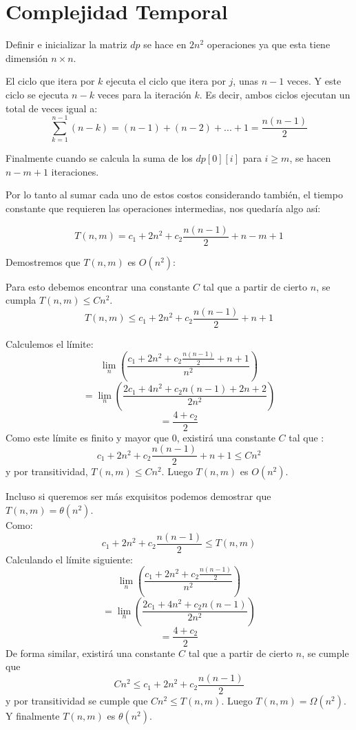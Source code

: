 \documentclass[a4paper]{article}
\begin{document}
	\section*{Complejidad Temporal}
	
	Definir e inicializar la matriz $dp$ se hace en $2n^2$ operaciones ya que esta tiene dimensión $n \times n$.
	
	El ciclo que itera por $k$ ejecuta el ciclo que itera por $j$, unas $n-1$ veces. Y este ciclo se ejecuta $n-k$ veces para la iteración $k$. Es decir, ambos ciclos ejecutan un total de veces igual a:
	$$ \sum_{k=1}^{n-1} (n-k) = (n-1) + (n-2) + ... + 1 = \frac{n(n-1)}{2} $$
	
	Finalmente cuando se calcula la suma de los $dp[0][i]$ para $i \geq m$, se hacen $n-m + 1$ iteraciones.
	
	Por lo tanto al sumar cada uno de estos costos considerando también, el tiempo constante que requieren las operaciones intermedias, nos quedaría algo así:
	
	$$T(n,m) = c_1 + 2n^2 + c_2\frac{n(n-1)}{2} + n-m+1$$
	
	Demostremos que $T(n,m)$ es $O(n^2)$:
	
	Para esto debemos encontrar una constante $C$ tal que a partir de cierto $n$, se cumpla $T(n,m) \leq Cn^2$.
	$$T(n,m) \leq c_1 + 2n^2 + c_2\frac{n(n-1)}{2} + n + 1$$
	
	Calculemos el límite:
	$$ \lim_{n}\left(\frac{c_1 + 2n^2 + c_2\frac{n(n-1)}{2} + n + 1}{n^2}\right)$$
	$$= \lim_{n}\left(\frac{2c_1 + 4n^2 + c_2n(n-1) + 2n + 2}{2n^2}\right)$$
	$$= \frac{4+c_2}{2}$$
	Como este límite es finito y mayor que $0$, existirá una constante $C$ tal que :
	$$ c_1 + 2n^2 + c_2\frac{n(n-1)}{2} + n + 1 \leq Cn^2$$
	y por transitividad, $ T(n,m) \leq Cn^2 $. Luego $T(n,m)$ es $O(n^2)$.
	
	Incluso si queremos ser más exquisitos podemos demostrar que $T(n,m) = \theta(n^2)$. \\
	
	Como:
	$$c_1 + 2n^2 + c_2\frac{n(n-1)}{2} \leq T(n,m)$$
	Calculando el límite siguiente:
	$$ \lim_{n}\left(\frac{c_1 + 2n^2 + c_2\frac{n(n-1)}{2}}{n^2}\right)$$
	$$= \lim_{n}\left(\frac{2c_1 + 4n^2 + c_2n(n-1)}{2n^2}\right)$$
	$$= \frac{4+c_2}{2}$$
	De forma similar, existirá una constante $C$ tal que a partir de cierto $n$, se cumple que 
	$$Cn^2 \leq c_1 + 2n^2 + c_2\frac{n(n-1)}{2}$$
	y por transitividad se cumple que $Cn^2 \leq T(n,m)$. Luego $T(n,m) = \Omega(n^2)$. Y finalmente $T(n,m)$ es $\theta(n^2)$.
	
\end{document}
